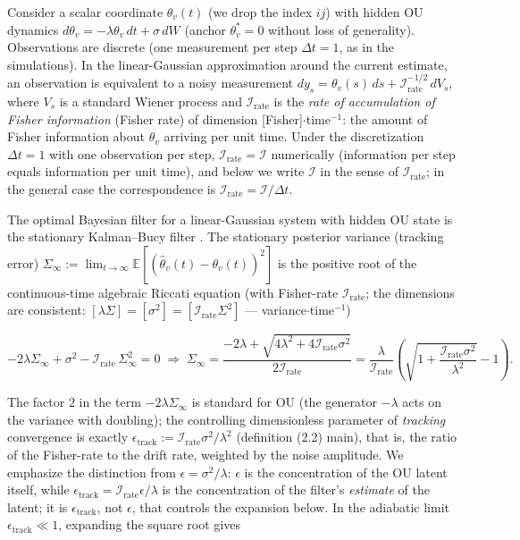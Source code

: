 \documentclass[12pt]{iopart}
\begin{document}
Consider a scalar coordinate \(\theta_v(t)\) (we drop the index \(ij\)) with hidden OU dynamics \(d\theta_v = -\lambda\theta_v\,dt + \sigma\,dW\) (anchor \(\theta_v^* = 0\) without loss of generality). Observations are discrete (one measurement per step \(\Delta t = 1\), as in the simulations). In the linear-Gaussian approximation around the current estimate, an observation is equivalent to a noisy measurement \(dy_s = \theta_v(s)\,ds + \mathcal I_{\text{rate}}^{-1/2}\,dV_s\), where \(V_s\) is a standard Wiener process and \(\mathcal I_{\text{rate}}\) is the \emph{rate of accumulation of Fisher information} (Fisher rate) of dimension {[}Fisher{]}\(\cdot\)time\(^{-1}\): the amount of Fisher information about \(\theta_v\) arriving per unit time. Under the discretization \(\Delta t = 1\) with one observation per step, \(\mathcal I_{\text{rate}} = \mathcal I\) numerically (information per step equals information per unit time), and below we write \(\mathcal I\) in the sense of \(\mathcal I_{\text{rate}}\); in the general case the correspondence is \(\mathcal I_{\text{rate}} = \mathcal I/\Delta t\).



The optimal Bayesian filter for a linear-Gaussian system with hidden OU state is the stationary Kalman--Bucy filter \cite{KalmanBucy1961,AndersonMoore1979}. The stationary posterior variance (tracking error) \(\Sigma_\infty := \lim_{t\to\infty}\mathbb{E}[(\hat\theta_v(t)-\theta_v(t))^2]\) is the positive root of the continuous-time algebraic Riccati equation (with Fisher-rate \(\mathcal I_{\text{rate}}\); the dimensions are consistent: \([\lambda\Sigma] = [\sigma^2] = [\mathcal I_{\text{rate}}\Sigma^2]\) --- variance\(\cdot\)time\(^{-1}\))



\begin{equation}-2\lambda\Sigma_\infty + \sigma^2 - \mathcal I_{\text{rate}}\,\Sigma_\infty^2 = 0 \;\Longrightarrow\; \Sigma_\infty = \frac{-2\lambda + \sqrt{4\lambda^2 + 4\mathcal I_{\text{rate}}\sigma^2}}{2\mathcal I_{\text{rate}}} = \frac{\lambda}{\mathcal I_{\text{rate}}}\left(\sqrt{1 + \frac{\mathcal I_{\text{rate}}\sigma^2}{\lambda^2}} - 1\right). \tag{S1.2}\end{equation}



The factor \(2\) in the term \(-2\lambda\Sigma_\infty\) is standard for OU (the generator \(-\lambda\) acts on the variance with doubling); the controlling dimensionless parameter of \emph{tracking} convergence is exactly \(\epsilon_{\text{track}} := \mathcal I_{\text{rate}}\sigma^2/\lambda^2\) (definition (2.2) main), that is, the ratio of the Fisher-rate to the drift rate, weighted by the noise amplitude. We emphasize the distinction from \(\epsilon = \sigma^2/\lambda\): \(\epsilon\) is the concentration of the OU latent itself, while \(\epsilon_{\text{track}} = \mathcal I_{\text{rate}}\epsilon/\lambda\) is the concentration of the filter's \emph{estimate} of the latent; it is \(\epsilon_{\text{track}}\), not \(\epsilon\), that controls the expansion below. In the adiabatic limit \(\epsilon_{\text{track}} \ll 1\), expanding the square root gives
\end{document}
